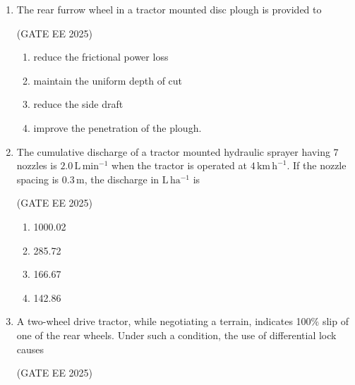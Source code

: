 \documentclass[journal,12pt,onecolumn]{IEEEtran}
\theoremstyle{remark}
\begin{document}
\begin{enumerate}
\hfill(GATE EE 2025)

\begin{multicols}{4}
\begin{enumerate}
    \item 0.33
    \item 0.50
    \item 1.11
    \item 1.61
\end{enumerate}
\end{multicols}

\item The rear furrow wheel in a tractor mounted disc plough is provided to\

\hfill(GATE EE 2025)

\begin{enumerate}
    \item reduce the frictional power loss 
    \item maintain the uniform depth of cut
    \item reduce the side draft 
    \item improve the penetration of the plough.
\end{enumerate}
\item The cumulative discharge of a tractor mounted hydraulic sprayer having 7 nozzles is $2.0\,\mathrm{L\,min^{-1}}$ when the tractor is operated at $4\,\mathrm{km\,h^{-1}}$. If the nozzle spacing is $0.3\,\mathrm{m}$, the discharge in $\mathrm{L\,ha^{-1}}$ is\

\hfill(GATE EE 2025)

\begin{multicols}{4}
\begin{enumerate}
    \item 1000.02
    \item 285.72
    \item 166.67
    \item 142.86
\end{enumerate}
\end{multicols}

\item A two-wheel drive tractor, while negotiating a terrain, indicates 100\% slip of one of the rear wheels. Under such a condition, the use of differential lock causes\

\hfill(GATE EE 2025)


\end{enumerate}
\end{document}

